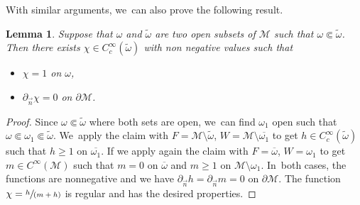 \documentclass[JEP,XML,SOM,Unicode,published]{cedram}
\newcommand{\spfrac}[2]{\sfrac{#1}{(#2)}}
\newtheorem{lemma}[theorem]{Lemma}
\theoremstyle{definition}
\let\mc\mathcal
\newcommand{\M}{\mc{M}}
\begin{document}
With similar arguments, we~can also prove the following result.
\begin{lemma}\label{lemma:omomtilde-smaller-subset}
Suppose that $\omega$ and $\widetilde{\omega}$ are two open subsets of $\M$ such that $\omega \Subset \widetilde{\omega}$. Then there exists $\chi\in C^{\infty}_c(\widetilde{\omega})$ with non negative values such that
\begin{itemize}
\item $\chi=1$ on $\omega$,
\item $\partial_{\vec n} \chi=0$ on $\partial \M$.
\end{itemize}
\end{lemma}
\begin{proof}
Since $\omega \Subset \widetilde{\omega}$ where both sets are open, we~can find $\omega_1$ open such that $\omega \Subset \omega_1 \Subset \widetilde{\omega}$. We~apply the claim with $F=\M\setminus \widetilde{\omega}$, $W=\M\setminus \overline{\omega_1}$ to get $h\in C^{\infty}_c(\widetilde{\omega})$ such that $h\geq 1$ on $\overline{\omega_1}$. If we apply again the claim with $F=\overline{\omega}$, $W=\omega_1$ to get $m\in C^{\infty}(\M)$ such that $m=0$ on $\overline{\omega}$ and $m\geq 1$ on $\M\setminus\omega_1$. In~both cases, the functions are nonnegative and we have $\partial_{\vec n} h=\partial_{\vec n} m=0$ on $\partial \M$. The function $\chi=\spfrac{h}{m+h}$ is regular and has the desired properties.
\end{proof}




\end{document}
